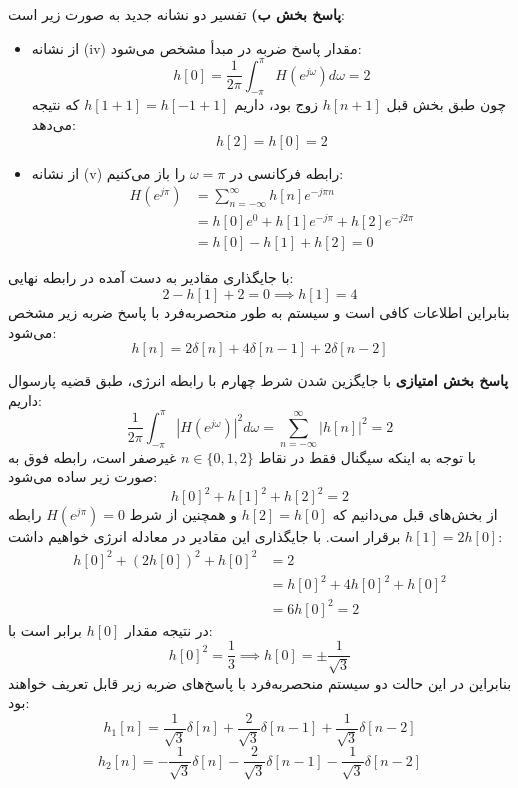 \newpage

\textbf{پاسخ بخش ب)}
تفسیر دو نشانه جدید به صورت زیر است:
\begin{itemize}
    \item از نشانه (iv) مقدار پاسخ ضربه در مبدأ مشخص می‌شود:
    \[ h[0] = \frac{1}{2\pi} \int_{-\pi}^{\pi} H(e^{j\omega}) d\omega = 2 \]
    چون طبق بخش قبل $h[n+1]$ زوج بود، داریم $h[1+1] = h[-1+1]$ که نتیجه می‌دهد:
    \[ h[2] = h[0] = 2 \]
    \item از نشانه (v) رابطه فرکانسی در $\omega = \pi$ را باز می‌کنیم:
    \[
    \begin{aligned}
    H(e^{j\pi}) &= \sum_{n=-\infty}^{\infty} h[n] e^{-j\pi n} \\
    &= h[0]e^0 + h[1]e^{-j\pi} + h[2]e^{-j2\pi} \\
    &= h[0] - h[1] + h[2] = 0
    \end{aligned}
    \]
\end{itemize}
با جایگذاری مقادیر به دست آمده در رابطه نهایی:
\[ 2 - h[1] + 2 = 0 \implies h[1] = 4 \]
بنابراین اطلاعات کافی است و سیستم به طور منحصربه‌فرد با پاسخ ضربه زیر مشخص می‌شود:
\[ h[n] = 2\delta[n] + 4\delta[n-1] + 2\delta[n-2] \]

\textbf{پاسخ بخش امتیازی}
با جایگزین شدن شرط چهارم با رابطه انرژی، طبق قضیه پارسوال داریم:
\[ \frac{1}{2\pi} \int_{-\pi}^{\pi} |H(e^{j\omega})|^2 d\omega = \sum_{n=-\infty}^{\infty} |h[n]|^2 = 2 \]
با توجه به اینکه سیگنال فقط در نقاط $n \in \{0, 1, 2\}$ غیرصفر است، رابطه فوق به صورت زیر ساده می‌شود:
\[ h[0]^2 + h[1]^2 + h[2]^2 = 2 \]
از بخش‌های قبل می‌دانیم که $h[2] = h[0]$ و همچنین از شرط $H(e^{j\pi}) = 0$ رابطه $h[1] = 2h[0]$ برقرار است. با جایگذاری این مقادیر در معادله انرژی خواهیم داشت:
\[
\begin{aligned}
h[0]^2 + (2h[0])^2 + h[0]^2 &= 2 \\
&= h[0]^2 + 4h[0]^2 + h[0]^2 \\
&= 6h[0]^2 = 2
\end{aligned}
\]
در نتیجه مقدار $h[0]$ برابر است با:
\[ h[0]^2 = \frac{1}{3} \implies h[0] = \pm \frac{1}{\sqrt{3}} \]
بنابراین در این حالت دو سیستم منحصربه‌فرد با پاسخ‌های ضربه زیر قابل تعریف خواهند بود:
\[ 
h_1[n] = \frac{1}{\sqrt{3}}\delta[n] + \frac{2}{\sqrt{3}}\delta[n-1] + \frac{1}{\sqrt{3}}\delta[n-2]
\]
\[
h_2[n] = -\frac{1}{\sqrt{3}}\delta[n] - \frac{2}{\sqrt{3}}\delta[n-1] - \frac{1}{\sqrt{3}}\delta[n-2]
\]